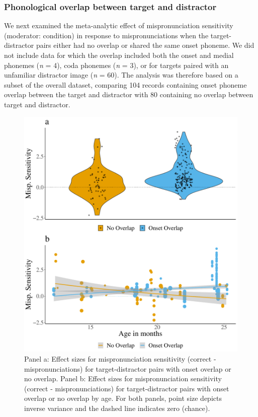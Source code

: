 \documentclass[man]{apa6}
\begin{document}
\hypertarget{phonological-overlap-between-target-and-distractor}{%
\subsubsection{Phonological overlap between target and distractor}\label{phonological-overlap-between-target-and-distractor}}

We next examined the meta-analytic effect of mispronunciation sensitivity (moderator: condition) in response to mispronunciations when the target-distractor pairs either had no overlap or shared the same onset phoneme. We did not include data for which the overlap included both the onset and medial phonemes (\emph{n} = 4), coda phonemes (\emph{n} = 3), or for targets paired with an unfamiliar distractor image (\emph{n} = 60). The analysis was therefore based on a subset of the overall dataset, comparing 104 records containing onset phoneme overlap between the target and distractor with 80 containing no overlap between target and distractor.

\begin{figure}
\centering
\includegraphics{VonHolzenBergmann_MPMetaAnalysis_files/figure-latex/PlotDistOverlap-1.pdf}
\caption{\label{fig:PlotDistOverlap}Panel a: Effect sizes for mispronunciation sensitivity (correct - mispronunciations) for target-distractor pairs with onset overlap or no overlap. Panel b: Effect sizes for mispronunciation sensitivity (correct - mispronunciations) for target-distractor pairs with onset overlap or no overlap by age. For both panels, point size depicts inverse variance and the dashed line indicates zero (chance).}
\end{figure}
\end{document}

